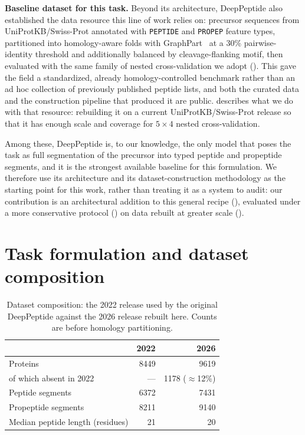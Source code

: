 \documentclass{article}
\begin{document}
\textbf{Baseline dataset for this task.} Beyond its architecture, DeepPeptide also established the data resource this line of work relies on: precursor sequences from UniProtKB/Swiss-Prot annotated with \texttt{PEPTIDE} and \texttt{PROPEP} feature types, partitioned into homology-aware folds with GraphPart~\citep{graphpart2023} at a 30\% pairwise-identity threshold and additionally balanced by cleavage-flanking motif, then evaluated with the same family of nested cross-validation we adopt (). This gave the field a standardized, already homology-controlled benchmark rather than an ad hoc collection of previously published peptide lists, and both the curated data and the construction pipeline that produced it are public.  describes what we do with that resource: rebuilding it on a current UniProtKB/Swiss-Prot release so that it has enough scale and coverage for $5\times4$ nested cross-validation.

Among these, DeepPeptide is, to our knowledge, the only model that poses the task as full segmentation of the precursor into typed peptide and propeptide segments, and it is the strongest available baseline for this formulation. We therefore use its architecture and its dataset-construction methodology as the starting point for this work, rather than treating it as a system to audit: our contribution is an architectural addition to this general recipe (), evaluated under a more conservative protocol () on data rebuilt at greater scale ().


\section{Task formulation and dataset composition}
\label{sec:app-problem}

\begin{table}[h]
\centering
\caption{Dataset composition: the 2022 release used by the original DeepPeptide against the 2026 release rebuilt here. Counts are before homology partitioning.}
\label{tab:dataset}
\small
\begin{tabular}{lrr}
\toprule
 & \textbf{2022} & \textbf{2026} \\
\midrule
Proteins & 8449 & 9619 \\
\quad of which absent in 2022 & --- & 1178 ($\approx$12\%) \\
Peptide segments & 6372 & 7431 \\
Propeptide segments & 8211 & 9140 \\
Median peptide length (residues) & 21 & 20 \\
\bottomrule
\end{tabular}
\end{table}
\end{document}
